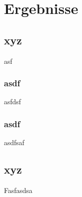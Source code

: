 \chapter{Ergebnisse}




\section{xyz}

asf


\subsection{asdf}

asfdsf

\subsection{asdf}

asdfsaf



\section{xyz}

Fasfasdsa

